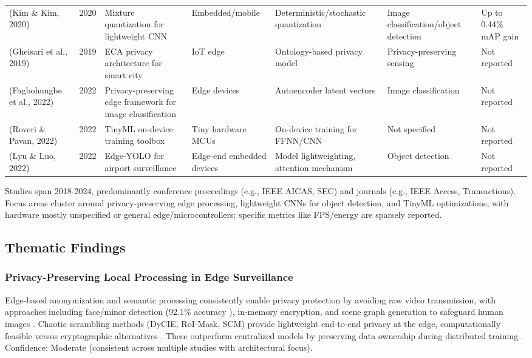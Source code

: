 \documentclass[12pt, a4paper]{article}
\begin{document}
\begin{landscape}
\begin{longtable}{ p{3.5cm} p{0.8cm} p{3.5cm} p{3cm} p{3.5cm} p{3.5cm} p{3.5cm} }
(Kim \& Kim, 2020) \cite{kim2020} & 2020 & Mixture quantization for lightweight CNN & Embedded/mobile & Deterministic/stochastic quantization & Image classification/object detection & Up to 0.44\% mAP gain \\

(Gheisari et al., 2019) \cite{gheisari2019} & 2019 & ECA privacy architecture for smart city & IoT edge & Ontology-based privacy model & Privacy-preserving sensing & Not reported \\

(Fagbohungbe et al., 2022) \cite{fagbohungbe2022} & 2022 & Privacy-preserving edge framework for image classification & Edge devices & Autoencoder latent vectors & Image classification & Not reported \\

(Roveri \& Pavan, 2022) \cite{roveri2022} & 2022 & TinyML on-device training toolbox & Tiny hardware MCUs & On-device training for FFNN/CNN & Not specified & Not reported \\

(Lyu \& Luo, 2022) \cite{lyu2022} & 2022 & Edge-YOLO for airport surveillance & Edge-end embedded devices & Model lightweighting, attention mechanism & Object detection & Not reported \\

\end{longtable}
\end{landscape}

\normalsize

Studies span 2018-2024, predominantly conference proceedings (e.g., IEEE AICAS, SEC) and journals (e.g., IEEE Access, Transactions). Focus areas cluster around privacy-preserving edge processing, lightweight CNNs for object detection, and TinyML optimizations, with hardware mostly unspecified or general edge/microcontrollers; specific metrics like FPS/energy are sparsely reported.

\subsection{Thematic Findings}

\subsubsection{Privacy-Preserving Local Processing in Edge Surveillance}
Edge-based anonymization and semantic processing consistently enable privacy protection by avoiding raw video transmission, with approaches including face/minor detection (92.1\% accuracy \cite{yuan2020}), in-memory encryption, and scene graph generation to safeguard human images \cite{myneni2022, huang2023}. Chaotic scrambling methods (DyCIE, RoI-Mask, SCM) provide lightweight end-to-end privacy at the edge, computationally feasible versus cryptographic alternatives \cite{fitwi2021}. These outperform centralized models by preserving data ownership during distributed training \cite{myneni2022}. Confidence: Moderate (consistent across multiple studies with architectural focus).
\end{document}

